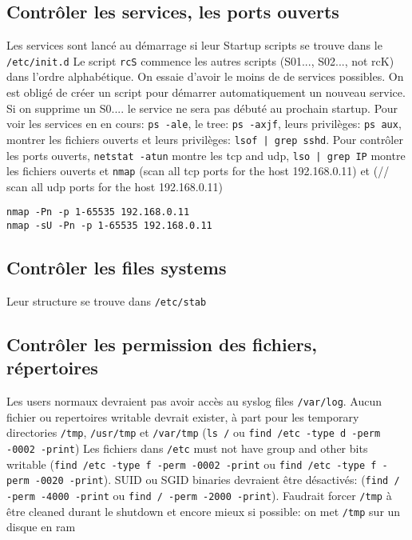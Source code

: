 \subsection{Contrôler les services, les ports ouverts}
Les services sont lancé au démarrage si leur Startup scripts se trouve dans le \verb!/etc/init.d!
Le script \verb!rcS! commence les autres scripts (S01..., S02..., not rcK) dans l'ordre alphabétique. On essaie d'avoir le moins de de services possibles. On est obligé de créer un script pour démarrer automatiquement un nouveau service. Si on supprime un S0.... le service ne sera pas débuté au prochain startup. Pour voir les services en en cours: \verb!ps -ale!, le tree: \verb!ps -axjf!, leurs privilèges: \verb!ps aux!, montrer les fichiers ouverts et leurs privilèges: \verb!lsof | grep sshd!. Pour contrôler les ports ouverts, \verb!netstat -atun! montre les tcp and udp, \verb!lso | grep IP! montre les fichiers ouverts et \verb!nmap! (scan all tcp ports for the host 192.168.0.11) et (// scan all udp ports for the host 192.168.0.11)
\begin{Verbatim}[breaklines=true, breakanywhere=true]
nmap -Pn -p 1-65535 192.168.0.11 
nmap -sU -Pn -p 1-65535 192.168.0.11 
\end{Verbatim}

\subsection{Contrôler les files systems}
Leur structure se trouve dans \verb!/etc/stab!

\subsection{Contrôler les permission des fichiers, répertoires}
Les users normaux devraient pas avoir accès au syslog files \verb!/var/log!. Aucun fichier ou repertoires writable devrait exister, à part pour les temporary directories \verb!/tmp!, \verb!/usr/tmp! et \verb!/var/tmp! (\verb!ls /! ou \verb!find /etc -type d -perm -0002 -print!) 
Les fichiers dans \verb!/etc! must not have group and other bits writable (\verb!find /etc -type f -perm -0002 -print! ou \verb!find /etc -type f -perm -0020 -print!). SUID ou SGID binaries devraient être désactivés: (\verb!find / -perm -4000 -print! ou \verb!find / -perm -2000 -print!). Faudrait forcer \verb!/tmp! à être cleaned durant le shutdown et encore mieux si possible: on met \verb!/tmp! sur un disque en ram

